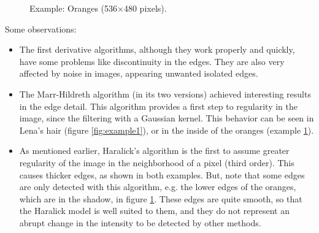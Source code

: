 \documentclass{ipol}
\numberwithin{equation}{section}
\numberwithin{table}{section}
\numberwithin{figure}{section}
\begin{document}
\begin{figure}[t!]
	\quad
	\quad
	\caption{Example: Oranges (536$\times$480 pixels).}
	\label{fig:example2}
\end{figure}

Some observations: 
\begin{itemize}
	\item The first derivative algorithms, although they work properly and quickly, have some problems like discontinuity in the edges. They are also very affected by noise in images, appearing unwanted isolated edges. \\
	\item The Marr-Hildreth algorithm (in its two versions) achieved interesting results in the edge detail. This algorithm provides a first step to regularity in the image, since the filtering with a Gaussian kernel. This behavior can be seen in Lena's hair (figure \ref{fig:example1}), or in the inside of the oranges (example \ref{fig:example2}). \\
	\item As mentioned earlier, Haralick's algorithm is the first to assume greater regularity of the image in the neighborhood of a pixel (third order). This causes thicker edges, as shown in both examples. But, note that some edges are only detected with this algorithm, e.g. the lower edges of the oranges, which are in the shadow, in figure \ref{fig:example2}. These edges are quite smooth, so that the Haralick model is well suited to them, and they do not represent an abrupt change in the intensity to be detected by other methods. \\
\end{itemize}
\end{document}
